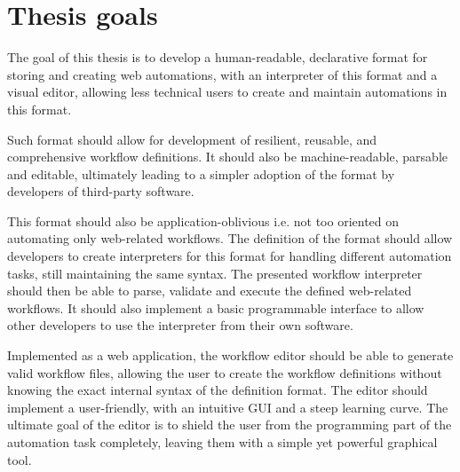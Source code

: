 \section*{Thesis goals}
The goal of this thesis is to develop a human-readable, declarative format for storing and creating web automations, with an interpreter of this format and a visual editor, allowing less technical users to create and maintain automations in this format.
\par
Such format should allow for development of resilient, reusable, and comprehensive workflow definitions. 
It should also be machine-readable, parsable and editable, ultimately leading to a simpler adoption of the format by developers of third-party software.
\par
This format should also be application-oblivious i.e. not too oriented on automating only web-related workflows.
The definition of the format should allow developers to create interpreters for this format for handling different automation tasks, still maintaining the same syntax.
The presented workflow interpreter should then be able to parse, validate and execute the defined web-related workflows. 
It should also implement a basic programmable interface to allow other developers to use the interpreter from their own software.
\par
Implemented as a web application, the workflow editor should be able to generate valid workflow files, allowing the user to create the workflow definitions without knowing the exact internal syntax of the definition format.
The editor should implement a user-friendly, with an intuitive \ac{GUI} and a steep learning curve.
The ultimate goal of the editor is to shield the user from the programming part of the automation task completely, leaving them with a simple yet powerful graphical tool.

